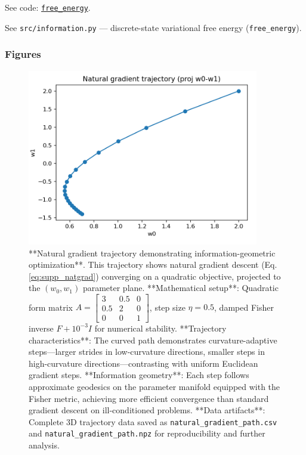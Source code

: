 \documentclass[
  10pt,
]{article}
\begin{document}
See code:
\href{03_quadray_methods.md\#code:free_energy}{\texttt{free\_energy}}.

See \texttt{src/information.py} --- discrete-state variational free
energy (\texttt{free\_energy}).

\hypertarget{figures}{%
\subsubsection{Figures}\label{figures}}

\begin{figure}[htbp]
\centering
\includegraphics[width=0.9\textwidth]{figures/natural_gradient_path.png}
\caption{**Natural gradient trajectory demonstrating information-geometric optimization**. This trajectory shows natural gradient descent (Eq. \ref{eq:supp_natgrad}) converging on a quadratic objective, projected to the $(w_0, w_1)$ parameter plane. **Mathematical setup**: Quadratic form matrix $A=\begin{bmatrix}3 & 0.5 & 0\\ 0.5 & 2 & 0\\ 0 & 0 & 1\end{bmatrix}$, step size $\eta=0.5$, damped Fisher inverse $F + 10^{-3} I$ for numerical stability. **Trajectory characteristics**: The curved path demonstrates curvature-adaptive steps—larger strides in low-curvature directions, smaller steps in high-curvature directions—contrasting with uniform Euclidean gradient steps. **Information geometry**: Each step follows approximate geodesics on the parameter manifold equipped with the Fisher metric, achieving more efficient convergence than standard gradient descent on ill-conditioned problems. **Data artifacts**: Complete 3D trajectory data saved as \texttt{natural\_gradient\_path.csv} and \texttt{natural\_gradient\_path.npz} for reproducibility and further analysis.}
\label{fig:natural_gradient_path}
\end{figure}
\end{document}
